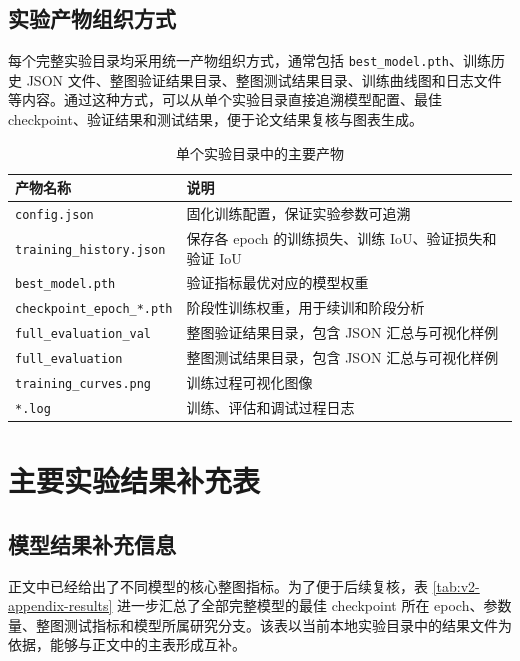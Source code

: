 \section{实验产物组织方式}
每个完整实验目录均采用统一产物组织方式，通常包括 \texttt{best\_model.pth}、训练历史 JSON 文件、整图验证结果目录、整图测试结果目录、训练曲线图和日志文件等内容。通过这种方式，可以从单个实验目录直接追溯模型配置、最佳 checkpoint、验证结果和测试结果，便于论文结果复核与图表生成。

\begin{table}[htbp]
\centering
\caption{单个实验目录中的主要产物}
\label{tab:v2-experiment-artifacts}
\begin{tabular}{p{3.8cm}p{9.2cm}}
\toprule
产物名称 & 说明 \\
\midrule
\texttt{config.json} & 固化训练配置，保证实验参数可追溯 \\
\texttt{training\_history.json} & 保存各 epoch 的训练损失、训练 IoU、验证损失和验证 IoU \\
\texttt{best\_model.pth} & 验证指标最优对应的模型权重 \\
\texttt{checkpoint\_epoch\_*.pth} & 阶段性训练权重，用于续训和阶段分析 \\
\texttt{full\_evaluation\_val} & 整图验证结果目录，包含 JSON 汇总与可视化样例 \\
\texttt{full\_evaluation} & 整图测试结果目录，包含 JSON 汇总与可视化样例 \\
\texttt{training\_curves.png} & 训练过程可视化图像 \\
\texttt{*.log} & 训练、评估和调试过程日志 \\
\bottomrule
\end{tabular}
\end{table}

\chapter{主要实验结果补充表}
\label{app:v2-results}

\section{模型结果补充信息}
正文中已经给出了不同模型的核心整图指标。为了便于后续复核，表 \ref{tab:v2-appendix-results} 进一步汇总了全部完整模型的最佳 checkpoint 所在 epoch、参数量、整图测试指标和模型所属研究分支。该表以当前本地实验目录中的结果文件为依据，能够与正文中的主表形成互补。

